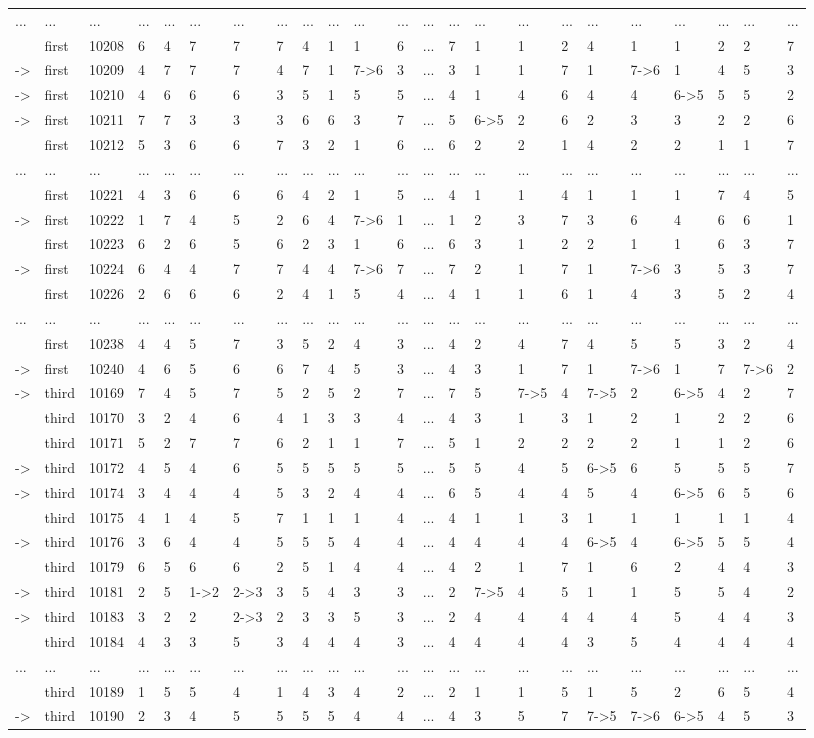 \documentclass[6pt]{article}
\begin{document}
\begin{landscape}
{\begin{longtable}{lllllllllllllllllllllll}
...&...&...&...&...&...&...&...&...&...&...&...&...&...&...&...&...&...&...&...&...&...&...\tabularnewline
&first&10208&6&4&7&7&7&4&1&1&6&...&7&1&1&2&4&1&1&2&2&7\tabularnewline
-\textgreater &first&10209&4&7&7&7&4&7&1&7-\textgreater 6&3&...&3&1&1&7&1&7-\textgreater 6&1&4&5&3\tabularnewline
-\textgreater &first&10210&4&6&6&6&3&5&1&5&5&...&4&1&4&6&4&4&6-\textgreater 5&5&5&2\tabularnewline
-\textgreater &first&10211&7&7&3&3&3&6&6&3&7&...&5&6-\textgreater 5&2&6&2&3&3&2&2&6\tabularnewline
&first&10212&5&3&6&6&7&3&2&1&6&...&6&2&2&1&4&2&2&1&1&7\tabularnewline
\newpage
...&...&...&...&...&...&...&...&...&...&...&...&...&...&...&...&...&...&...&...&...&...&...\tabularnewline
&first&10221&4&3&6&6&6&4&2&1&5&...&4&1&1&4&1&1&1&7&4&5\tabularnewline
-\textgreater &first&10222&1&7&4&5&2&6&4&7-\textgreater 6&1&...&1&2&3&7&3&6&4&6&6&1\tabularnewline
&first&10223&6&2&6&5&6&2&3&1&6&...&6&3&1&2&2&1&1&6&3&7\tabularnewline
-\textgreater &first&10224&6&4&4&7&7&4&4&7-\textgreater 6&7&...&7&2&1&7&1&7-\textgreater 6&3&5&3&7\tabularnewline
&first&10226&2&6&6&6&2&4&1&5&4&...&4&1&1&6&1&4&3&5&2&4\tabularnewline
...&...&...&...&...&...&...&...&...&...&...&...&...&...&...&...&...&...&...&...&...&...&...\tabularnewline
&first&10238&4&4&5&7&3&5&2&4&3&...&4&2&4&7&4&5&5&3&2&4\tabularnewline
-\textgreater &first&10240&4&6&5&6&6&7&4&5&3&...&4&3&1&7&1&7-\textgreater 6&1&7&7-\textgreater 6&2\tabularnewline
-\textgreater &third&10169&7&4&5&7&5&2&5&2&7&...&7&5&7-\textgreater 5&4&7-\textgreater 5&2&6-\textgreater 5&4&2&7\tabularnewline
&third&10170&3&2&4&6&4&1&3&3&4&...&4&3&1&3&1&2&1&2&2&6\tabularnewline
&third&10171&5&2&7&7&6&2&1&1&7&...&5&1&2&2&2&2&1&1&2&6\tabularnewline
-\textgreater &third&10172&4&5&4&6&5&5&5&5&5&...&5&5&4&5&6-\textgreater 5&6&5&5&5&7\tabularnewline
-\textgreater &third&10174&3&4&4&4&5&3&2&4&4&...&6&5&4&4&5&4&6-\textgreater 5&6&5&6\tabularnewline
&third&10175&4&1&4&5&7&1&1&1&4&...&4&1&1&3&1&1&1&1&1&4\tabularnewline
-\textgreater &third&10176&3&6&4&4&5&5&5&4&4&...&4&4&4&4&6-\textgreater 5&4&6-\textgreater 5&5&5&4\tabularnewline
&third&10179&6&5&6&6&2&5&1&4&4&...&4&2&1&7&1&6&2&4&4&3\tabularnewline
-\textgreater &third&10181&2&5&1-\textgreater 2&2-\textgreater 3&3&5&4&3&3&...&2&7-\textgreater 5&4&5&1&1&5&5&4&2\tabularnewline
-\textgreater &third&10183&3&2&2&2-\textgreater 3&2&3&3&5&3&...&2&4&4&4&4&4&5&4&4&3\tabularnewline
&third&10184&4&3&3&5&3&4&4&4&3&...&4&4&4&4&3&5&4&4&4&4\tabularnewline
...&...&...&...&...&...&...&...&...&...&...&...&...&...&...&...&...&...&...&...&...&...&...\tabularnewline
&third&10189&1&5&5&4&1&4&3&4&2&...&2&1&1&5&1&5&2&6&5&4\tabularnewline
-\textgreater &third&10190&2&3&4&5&5&5&5&4&4&...&4&3&5&7&7-\textgreater 5&7-\textgreater 6&6-\textgreater 5&4&5&3\tabularnewline

\end{longtable}}
\end{landscape}
\end{document}
